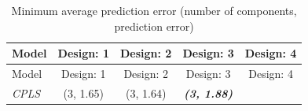 \documentclass[12pt,A4paper,authoryear]{elsarticle} %
\theoremstyle{definition}
\theoremstyle{definition}
\theoremstyle{remark}
\begin{document}
\begin{longtable}[]{@{}lcccc@{}}
\caption{\label{tab:min-error} Minimum average prediction error (number of
components, prediction error)}\tabularnewline
\toprule
\begin{minipage}[b]{0.10\columnwidth}\raggedright\strut
Model\strut
\end{minipage} & \begin{minipage}[b]{0.19\columnwidth}\centering\strut
Design: 1\strut
\end{minipage} & \begin{minipage}[b]{0.19\columnwidth}\centering\strut
Design: 2\strut
\end{minipage} & \begin{minipage}[b]{0.19\columnwidth}\centering\strut
Design: 3\strut
\end{minipage} & \begin{minipage}[b]{0.19\columnwidth}\centering\strut
Design: 4\strut
\end{minipage}\tabularnewline
\midrule
\endfirsthead
\toprule
\begin{minipage}[b]{0.10\columnwidth}\raggedright\strut
Model\strut
\end{minipage} & \begin{minipage}[b]{0.19\columnwidth}\centering\strut
Design: 1\strut
\end{minipage} & \begin{minipage}[b]{0.19\columnwidth}\centering\strut
Design: 2\strut
\end{minipage} & \begin{minipage}[b]{0.19\columnwidth}\centering\strut
Design: 3\strut
\end{minipage} & \begin{minipage}[b]{0.19\columnwidth}\centering\strut
Design: 4\strut
\end{minipage}\tabularnewline
\midrule
\endhead
\begin{minipage}[t]{0.10\columnwidth}\raggedright\strut
\emph{CPLS}\strut
\end{minipage} & \begin{minipage}[t]{0.19\columnwidth}\centering\strut
(3, 1.65)\strut
\end{minipage} & \begin{minipage}[t]{0.19\columnwidth}\centering\strut
(3, 1.64)\strut
\end{minipage} & \begin{minipage}[t]{0.19\columnwidth}\centering\strut
\textbf{\emph{(3, 1.88)}}\strut
\end{minipage} & \begin{minipage}[t]{0.19\columnwidth}\centering\strut

\end{minipage}
\end{longtable}
\end{document}
